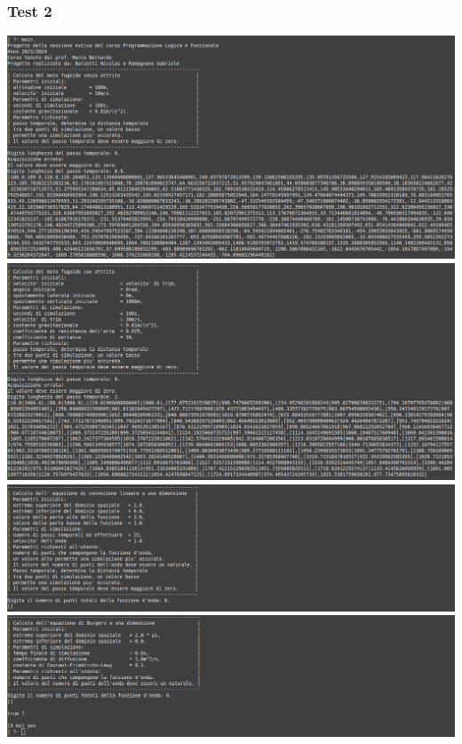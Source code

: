 \subsubsection*{Test 2}
\includegraphics[width=\textwidth,height=\textheight,keepaspectratio]{05_testing/image/pro/02_test/01.png}
\\
\includegraphics[width=\textwidth,height=\textheight,keepaspectratio]{05_testing/image/pro/02_test/02.png}
\\
\includegraphics[width=\textwidth,height=\textheight,keepaspectratio]{05_testing/image/pro/02_test/03.png}
\\
\includegraphics[width=\textwidth,height=\textheight,keepaspectratio]{05_testing/image/pro/02_test/04.png}

